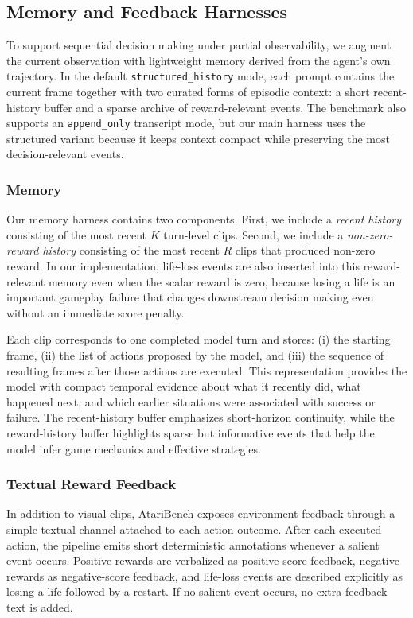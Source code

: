 \subsection{Memory and Feedback Harnesses}

To support sequential decision making under partial observability, we augment the current observation with lightweight memory derived from the agent's own trajectory. In the default \texttt{structured\_history} mode, each prompt contains the current frame together with two curated forms of episodic context: a short recent-history buffer and a sparse archive of reward-relevant events. The benchmark also supports an \texttt{append\_only} transcript mode, but our main harness uses the structured variant because it keeps context compact while preserving the most decision-relevant events.

\subsubsection{Memory}

Our memory harness contains two components. First, we include a \emph{recent history} consisting of the most recent $K$ turn-level clips. Second, we include a \emph{non-zero-reward history} consisting of the most recent $R$ clips that produced non-zero reward. In our implementation, life-loss events are also inserted into this reward-relevant memory even when the scalar reward is zero, because losing a life is an important gameplay failure that changes downstream decision making even without an immediate score penalty.

Each clip corresponds to one completed model turn and stores: (i) the starting frame, (ii) the list of actions proposed by the model, and (iii) the sequence of resulting frames after those actions are executed. This representation provides the model with compact temporal evidence about what it recently did, what happened next, and which earlier situations were associated with success or failure. The recent-history buffer emphasizes short-horizon continuity, while the reward-history buffer highlights sparse but informative events that help the model infer game mechanics and effective strategies.

\subsubsection{Textual Reward Feedback}

In addition to visual clips, AtariBench exposes environment feedback through a simple textual channel attached to each action outcome. After each executed action, the pipeline emits short deterministic annotations whenever a salient event occurs. Positive rewards are verbalized as positive-score feedback, negative rewards as negative-score feedback, and life-loss events are described explicitly as losing a life followed by a restart. If no salient event occurs, no extra feedback text is added.

